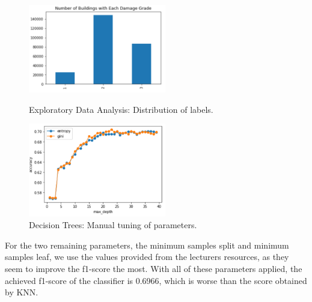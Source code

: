 \begin{figure}[h!]
  \begin{minipage}[b]{0.5\linewidth}
    \centering
    \includegraphics[width=60mm]{images/dt_figure01.png}
    \caption{Exploratory Data Analysis: Distribution of labels.}
    \label{PICTURE_figure_dt_01}
    \end{minipage}
  \hspace{0.1cm}
  \begin{minipage}[b]{0.5\linewidth}
    \centering
    \includegraphics[width=60mm]{images/dt_figure02.png}
    \caption{Decision Trees: Manual tuning of parameters.}
    \label{PICTURE_figure_dt_02}
  \end{minipage}
\end{figure}

For the two remaining parameters, the minimum samples split and minimum samples leaf, we use the values provided from the lecturers resources, as they seem to improve the f1-score the most. With all of these parameters applied, the achieved f1-score of the classifier is 0.6966, which is worse than the score obtained by KNN.